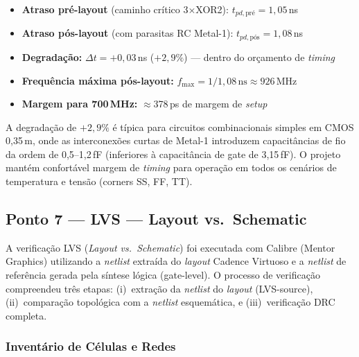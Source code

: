 \documentclass[12pt,a4paper]{article}
\begin{document}
\begin{resultbox}
\begin{itemize}[leftmargin=1.5em]
  \item \textbf{Atraso pré-layout} (caminho crítico 3$\times$XOR2): $t_{pd,\text{pré}} = 1{,}05$\,ns
  \item \textbf{Atraso pós-layout} (com parasitas RC Metal-1): $t_{pd,\text{pós}} = 1{,}08$\,ns
  \item \textbf{Degradação:} $\Delta t = +0{,}03$\,ns ($+2{,}9\%$) --- dentro do orçamento de \textit{timing}
  \item \textbf{Frequência máxima pós-layout:} $f_{\max} = 1/1{,}08\,\text{ns} \approx 926$\,MHz
  \item \textbf{Margem para 700\,MHz:} $\approx$378\,ps de margem de \textit{setup}
\end{itemize}
\end{resultbox}

A degradação de $+2{,}9\%$ é típica para circuitos combinacionais simples em CMOS 0,35\,\textmu m, onde as interconexões curtas de Metal-1 introduzem capacitâncias de fio da ordem de 0,5--1,2\,fF (inferiores à capacitância de gate de 3,15\,fF). O projeto mantém confortável margem de \textit{timing} para operação em todos os cenários de temperatura e tensão (corners SS, FF, TT).

\subsection{Ponto 7 --- LVS --- Layout vs.\ Schematic}

A verificação LVS (\textit{Layout vs.\ Schematic}) foi executada com Calibre (Mentor Graphics) utilizando a \textit{netlist} extraída do \textit{layout} Cadence Virtuoso e a \textit{netlist} de referência gerada pela síntese lógica (gate-level). O processo de verificação compreendeu três etapas: (i)~extração da \textit{netlist} do \textit{layout} (LVS-source), (ii)~comparação topológica com a \textit{netlist} esquemática, e (iii)~verificação DRC completa.

\subsubsection{Inventário de Células e Redes}
\end{document}
